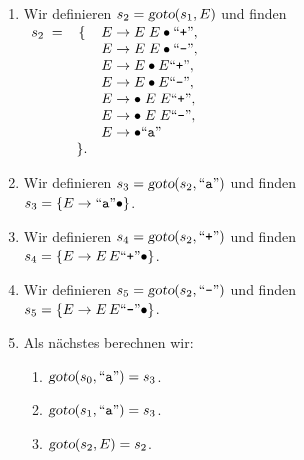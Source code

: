 \documentclass{article}
\newcommand{\quoted}[1]{\mbox{``\texttt{#1}''}}
\begin{document}
\begin{enumerate}
\begin{enumerate}
      \item Wir definieren $s_2 = \textsl{goto}(s_1, E)$ und finden
            \\[0.2cm]
            \hspace*{1.3cm}
            $
            \begin{array}[t]{lcl}
            s_2 \;= & \{ & E \rightarrow E\; E \bullet \quoted{+},  \\
                    &    & E \rightarrow E\; E \bullet \quoted{-},   \\
                    &    & E \rightarrow E \bullet E \quoted{+},    \\
                    &    & E \rightarrow E \bullet E \quoted{-},    \\
                    &    & E \rightarrow \bullet\; E\; E \quoted{+},  \\
                    &    & E \rightarrow \bullet\; E\; E \quoted{-},  \\
                    &    & E \rightarrow \bullet \quoted{a}           \\
                    & \}.
            \end{array}
            $
      \item Wir definieren $s_3 = \textsl{goto}(s_2, \quoted{a})$ und finden
            \\[0.2cm]
            \hspace*{1.3cm}
            $s_3 = \{ E \rightarrow \quoted{a} \bullet \}$.
      \item Wir definieren $s_4 = \textsl{goto}(s_2, \quoted{+})$ und finden
            \\[0.2cm]
            \hspace*{1.3cm}
            $s_4 = \{ E \rightarrow E\, E \quoted{+} \bullet \}$.
      \item Wir definieren $s_5 = \textsl{goto}(s_2, \quoted{-})$ und finden
            \\[0.2cm]
            \hspace*{1.3cm}
            $s_5 = \{ E \rightarrow E \, E \quoted{-} \bullet \}$.
      \item Als n\"achstes berechnen wir: 
        \begin{enumerate}
        \item $\textsl{goto}(s_0, \quoted{a}) = s_3$.
        \item $\textsl{goto}(s_1, \quoted{a}) = s_3$.
        \item $\textsl{goto}(s_2, E) = s_2$.
        \end{enumerate}
            


\end{enumerate}
\end{enumerate}
\end{document}
